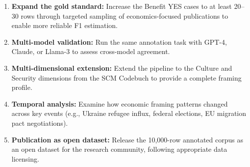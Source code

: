\begin{enumerate}
    \item \textbf{Expand the gold standard:} Increase the Benefit YES cases to at least 20--30 rows through targeted sampling of economics-focused publications to enable more reliable F1 estimation.
    
    \item \textbf{Multi-model validation:} Run the same annotation task with GPT-4, Claude, or Llama-3 to assess cross-model agreement.
    
    \item \textbf{Multi-dimensional extension:} Extend the pipeline to the Culture and Security dimensions from the SCM Codebuch to provide a complete framing profile.
    
    \item \textbf{Temporal analysis:} Examine how economic framing patterns changed across key events (e.g., Ukraine refugee influx, federal elections, EU migration pact negotiations).
    
    \item \textbf{Publication as open dataset:} Release the 10,000-row annotated corpus as an open dataset for the research community, following appropriate data licensing.
\end{enumerate}


